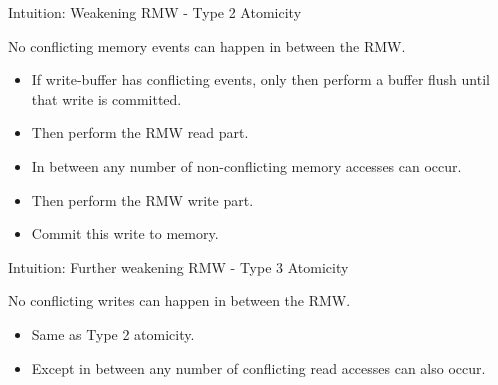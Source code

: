 \documentclass[xcolor=dvipsnames, notes]{beamer}
\begin{document}
    \begin{frame}{Intuition: Weakening RMW - Type 2 Atomicity}

        No conflicting memory events can happen in between the RMW.
        \begin{itemize}
            \item If write-buffer has conflicting events, only then perform a buffer flush until that write is committed.
            \item Then perform the RMW read part.
            \item In between any number of non-conflicting memory accesses can occur.
            \item Then perform the RMW write part.
            \item Commit this write to memory.  
        \end{itemize}

    \end{frame}


    \begin{frame}{Intuition: Further weakening RMW - Type 3 Atomicity}

        No conflicting writes can happen in between the RMW.
        \begin{itemize}
            \item Same as Type 2 atomicity. 
            \item Except in between any number of conflicting read accesses can also occur.
        \end{itemize}

    \end{frame}



    
\end{document}
